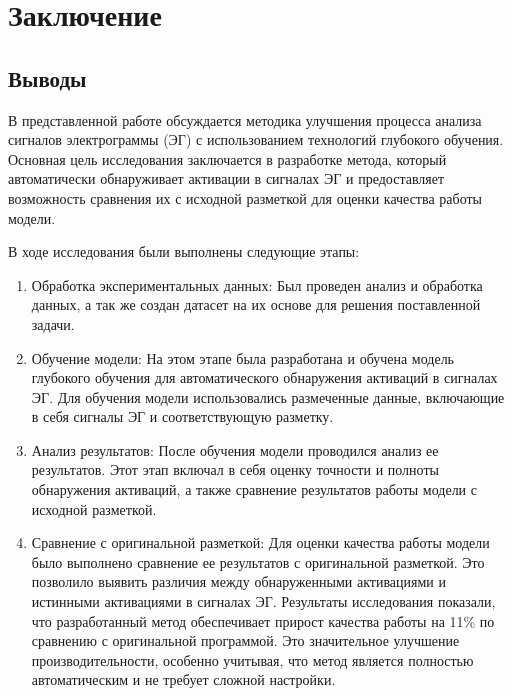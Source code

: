 \chapter{Заключение}
\section{Выводы}

В представленной работе обсуждается методика улучшения процесса анализа
сигналов электрограммы (ЭГ) с использованием технологий глубокого обучения.
Основная цель исследования заключается в разработке метода, который
автоматически обнаруживает активации в сигналах ЭГ и предоставляет возможность
сравнения их с исходной разметкой для оценки качества работы модели.

В ходе исследования были выполнены следующие этапы:

\begin{enumerate}

    \item Обработка экспериментальных данных: Был проведен анализ и обработка
    данных, а так же создан датасет на их основе для решения поставленной
    задачи.

    \item Обучение модели: На этом этапе была разработана и обучена модель глубокого
    обучения для автоматического обнаружения активаций в сигналах ЭГ. Для обучения
    модели использовались размеченные данные, включающие в себя сигналы ЭГ и
    соответствующую разметку.

    \item Анализ результатов: После обучения модели проводился
    анализ ее результатов. Этот этап включал в себя оценку точности и полноты
    обнаружения активаций, а также сравнение результатов работы модели с исходной
    разметкой.

    \item Сравнение с оригинальной разметкой: Для оценки качества работы
    модели было выполнено сравнение ее результатов с оригинальной разметкой. Это
    позволило выявить различия между обнаруженными активациями и истинными
    активациями в сигналах ЭГ. Результаты исследования показали, что разработанный
    метод обеспечивает прирост качества работы на 11\% по сравнению с оригинальной
    программой. Это значительное улучшение производительности, особенно учитывая,
    что метод является полностью автоматическим и не требует сложной настройки.

\end{enumerate}


